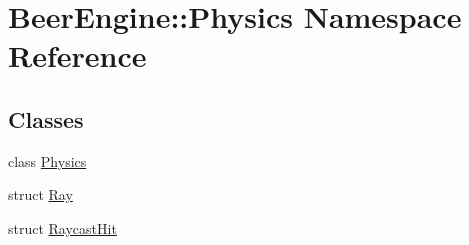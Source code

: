 \hypertarget{namespace_beer_engine_1_1_physics}{}\section{Beer\+Engine\+:\+:Physics Namespace Reference}
\label{namespace_beer_engine_1_1_physics}
\subsection*{Classes}
\begin{DoxyCompactItemize}
\item 
class \mbox{\hyperlink{class_beer_engine_1_1_physics_1_1_physics}{Physics}}
\item 
struct \mbox{\hyperlink{struct_beer_engine_1_1_physics_1_1_ray}{Ray}}
\item 
struct \mbox{\hyperlink{struct_beer_engine_1_1_physics_1_1_raycast_hit}{Raycast\+Hit}}
\end{DoxyCompactItemize}
